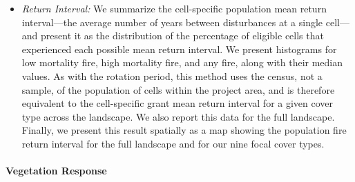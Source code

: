 \begin{itemize}
	\item \emph{Return Interval:} We summarize the cell-specific population mean return interval---the average number of years between disturbances at a single cell---and present it as the distribution of the percentage of eligible cells that experienced each possible mean return interval. We present histograms for low mortality fire, high mortality fire, and any fire, along with their median values. As with the rotation period, this method uses the census, not a sample, of the population of cells within the project area, and is therefore equivalent to the cell-specific grant mean return interval for a given cover type across the landscape. We also report this data for the full landscape. Finally, we present this result spatially as a map showing the population fire return interval for the full landscape and for our nine focal cover types.
\end{itemize}

\paragraph{Vegetation Response} 

